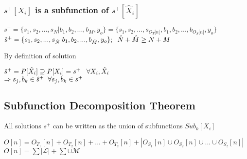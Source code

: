 \documentclass[11pt]{article}
\begin{document}
\subsubsection{$s^+[X_i]$ is a subfunction of $s^+[\hat{X}_i]$}
\begin{center}
\vspace{1mm}
$
s^+ = \{ s_1,s_2,...,s_N|b_1,b_2,...,b_M,y_o\} = \{ s_1,s_2,...,s_{O_T \lbrack n \rbrack }, b_1, b_2,...,b_{O_S \lbrack n \rbrack},y_o \}
$
\\ \vspace{2mm}
$
\hat{s}^+ = \{ s_1,s_2,...,s_{\hat{N}}|b_1,b_2,...,b_{\hat{M}},y_o\}; \hspace{2mm} \hat{N} + \hat{M} \geq N + M
$
\end{center}
\vspace{2mm}
By definition of solution
\begin{center}
\vspace{1mm}
$
\hat{s}^+ = P[\hat{X}_i] \supseteq P[X_i] = s^+ \hspace{3mm} \forall X_i,\hat{X}_i
$
\\ \vspace{2mm}
$
\Rightarrow s_j,b_k \in \hat{s}^+ \hspace{2mm} \forall s_j,b_k \in s^+
$
\end{center}



\subsection{Subfunction Decomposition Theorem}
All solutions $s^+$ can be written as the union of subfunctions $Sub_k[X_i]$
\begin{center}
$
O[n] = O_{T_1}[n] + O_{T_2}[n] + ... + O_{T_z}[n] + |O_{S_1}[n] \cup O_{S_2}[n] \cup  ... \cup O_{S_z}[n]|
$
\\ \vspace{2mm}
$
O[n] = \sum |\mathcal{L}| + \sum \cup \mathcal{M}
$
\end{center}
\end{document}
